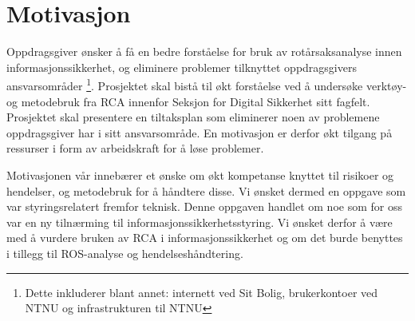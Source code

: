 \section{Motivasjon}
\label{sec:motivasjon}
Oppdragsgiver ønsker å få en bedre forståelse for bruk av rotårsaksanalyse innen informasjonssikkerhet, og eliminere problemer tilknyttet oppdragsgivers ansvarsområder \footnote{Dette inkluderer blant annet: internett ved Sit Bolig, brukerkontoer ved NTNU og infrastrukturen til NTNU}. Prosjektet skal bistå til økt forståelse ved å undersøke verktøy- og metodebruk fra RCA innenfor Seksjon for Digital Sikkerhet sitt fagfelt. Prosjektet skal presentere en tiltaksplan som eliminerer noen av problemene oppdragsgiver har i sitt ansvarsområde. En motivasjon er derfor økt tilgang på ressurser i form av arbeidskraft for å løse problemer. 


Motivasjonen vår innebærer et ønske om økt kompetanse knyttet til risikoer og hendelser, og metodebruk for å håndtere disse. Vi ønsket dermed en oppgave som var styringsrelatert fremfor teknisk. Denne oppgaven handlet om noe som for oss var en ny tilnærming til informasjonssikkerhetsstyring. Vi ønsket derfor å være med å vurdere bruken av RCA i informasjonssikkerhet og om det burde benyttes i tillegg til ROS-analyse og hendelseshåndtering. 